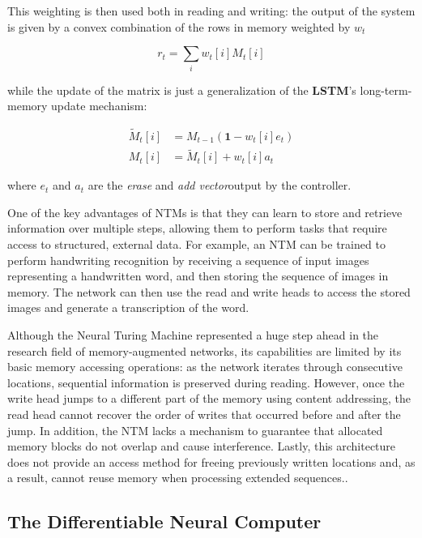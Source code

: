 \documentclass{article}
\begin{document}
This weighting is then used both in reading and writing: the output of the system is given by a convex combination of the rows in memory weighted by $w_t$

\begin{equation}
    r_t = \sum_i w_t[i]M_t[i]
\end{equation}

while the update of the matrix is just a generalization of the \textbf{LSTM}'s long-term-memory update mechanism:

\begin{align}
    \tilde{M}_t[i] &= M_{t-1}(\mathbf{1}-w_t[i] e_t)\\
    M_t[i] &= \tilde{M}_t[i] + w_t[i] a_t
\end{align}

where $e_t$ and $a_t$ are the \textit{erase} and \textit{add vector}output by the controller.

One of the key advantages of NTMs is that they can learn to store and retrieve information over multiple steps, allowing them to perform tasks that require access to structured, external data. For example, an NTM can be trained to perform handwriting recognition by receiving a sequence of input images representing a handwritten word, and then storing the sequence of images in memory. The network can then use the read and write heads to access the stored images and generate a transcription of the word.

Although the Neural Turing Machine represented a huge step ahead in the research field of memory-augmented networks, its capabilities are limited by its basic memory accessing operations: as the network iterates through consecutive locations, sequential information is preserved during reading. However, once the write head jumps to a different part of the memory using content addressing, the read head cannot recover the order of writes that occurred before and after the jump. In addition, the NTM lacks a mechanism to guarantee that allocated memory blocks do not overlap and cause interference. Lastly, this architecture does not provide an access method for freeing previously written locations and, as a result, cannot reuse memory when processing extended sequences..

\subsection{The Differentiable Neural Computer}
\end{document}
